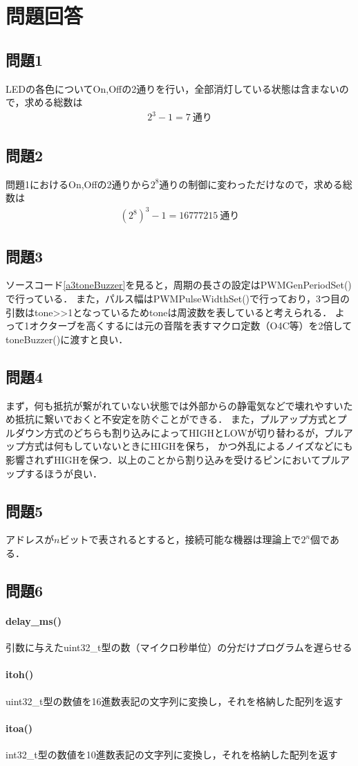 \documentclass{jlreq}
\begin{document}
\section{問題回答}
\subsection{問題1}
LEDの各色についてOn,Offの2通りを行い，全部消灯している状態は含まないので，求める総数は
\begin{align*}
    2^3-1=7\ 通り
\end{align*}

\subsection{問題2}
問題1におけるOn,Offの2通りから$2^8$通りの制御に変わっただけなので，求める総数は
\begin{align*}
    (2^8)^3-1=16777215\ 通り
\end{align*}

\subsection{問題3}
ソースコード\ref{a3toneBuzzer}を見ると，周期の長さの設定はPWMGenPeriodSet()で行っている．
また，パルス幅はPWMPulseWidthSet()で行っており，3つ目の引数はtone>>1となっているためtoneは周波数を表していると考えられる．
よって1オクターブを高くするには元の音階を表すマクロ定数（O4C等）を2倍してtoneBuzzer()に渡すと良い．

\subsection{問題4}
まず，何も抵抗が繋がれていない状態では外部からの静電気などで壊れやすいため抵抗に繋いでおくと不安定を防ぐことができる．
また，プルアップ方式とプルダウン方式のどちらも割り込みによってHIGHとLOWが切り替わるが，プルアップ方式は何もしていないときにHIGHを保ち，
かつ外乱によるノイズなどにも影響されずHIGHを保つ．以上のことから割り込みを受けるピンにおいてプルアップするほうが良い．

\subsection{問題5}
アドレスが$n$ビットで表されるとすると，接続可能な機器は理論上で$2^n$個である．

\subsection{問題6}
\paragraph{delay\_ms()}引数に与えたuint32\_t型の数（マイクロ秒単位）の分だけプログラムを遅らせる
\paragraph{itoh()}uint32\_t型の数値を16進数表記の文字列に変換し，それを格納した配列を返す
\paragraph{itoa()}int32\_t型の数値を10進数表記の文字列に変換し，それを格納した配列を返す
\end{document}
